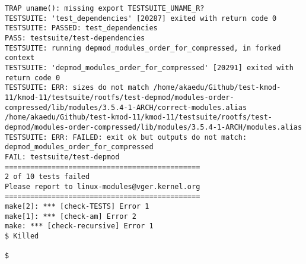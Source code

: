 \documentclass[11pt,a4paper]{article}
\begin{document}
{\begin{shaded}
\begin{verbatim}
TRAP uname(): missing export TESTSUITE_UNAME_R?
TESTSUITE: 'test_dependencies' [20287] exited with return code 0
TESTSUITE: PASSED: test_dependencies
PASS: testsuite/test-dependencies
TESTSUITE: running depmod_modules_order_for_compressed, in forked context
TESTSUITE: 'depmod_modules_order_for_compressed' [20291] exited with return code 0
TESTSUITE: ERR: sizes do not match /home/akaedu/Github/test-kmod-11/kmod-11/testsuite/rootfs/test-depmod/modules-order-compressed/lib/modules/3.5.4-1-ARCH/correct-modules.alias /home/akaedu/Github/test-kmod-11/kmod-11/testsuite/rootfs/test-depmod/modules-order-compressed/lib/modules/3.5.4-1-ARCH/modules.alias
TESTSUITE: ERR: FAILED: exit ok but outputs do not match: depmod_modules_order_for_compressed
FAIL: testsuite/test-depmod
==============================================
2 of 10 tests failed
Please report to linux-modules@vger.kernel.org
==============================================
make[2]: *** [check-TESTS] Error 1
make[1]: *** [check-am] Error 2
make: *** [check-recursive] Error 1
$ Killed

$ 
\end{verbatim}\end{shaded}}
\subsubsection{}
\end{document}
